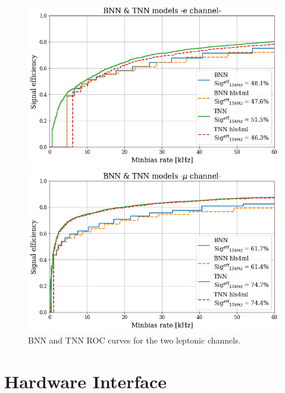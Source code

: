 \documentclass[../../main.tex]{subfiles}
\begin{document}
\begin{figure}[ht] 
  \label{ fig7} 
  \begin{minipage}[b]{0.5\linewidth}
    \centering
    \includegraphics[width=.9\linewidth]{sections/05/Images/BTNN_1ele_ROC.png} 
    \vspace{4ex}
  \end{minipage}%
  \begin{minipage}[b]{0.5\linewidth}
    \centering
    \includegraphics[width=.9\linewidth]{sections/05/Images/BTNN_1mu_ROC.png}
    \vspace{4ex}
  \end{minipage} 
  \caption{BNN and TNN ROC curves for the two leptonic channels.}
  \label{fig:BTNN_models}
\end{figure}

        
\section{Hardware Interface}
\label{sec:P2GT_Int}
\end{document}
